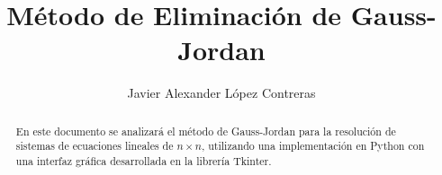 \documentclass{rmf-d}
\begin{document}
\title{Método de Eliminación de Gauss-Jordan\vspace{-6pt}}
\author{Javier Alexander López Contreras}

\address{Facultad de Ciencias Físico Matemáticas (FCFM), Universidad Autónoma de Coahuila, Campus Campo Redondo}

\maketitle

\begin{center}
\end{center}

\begin{abstract}
En este documento se analizará el método de Gauss-Jordan para la resolución de sistemas de ecuaciones lineales de $n \times n$, utilizando una implementación en Python con una interfaz gráfica desarrollada en la librería Tkinter.
\end{abstract}
\end{document}
